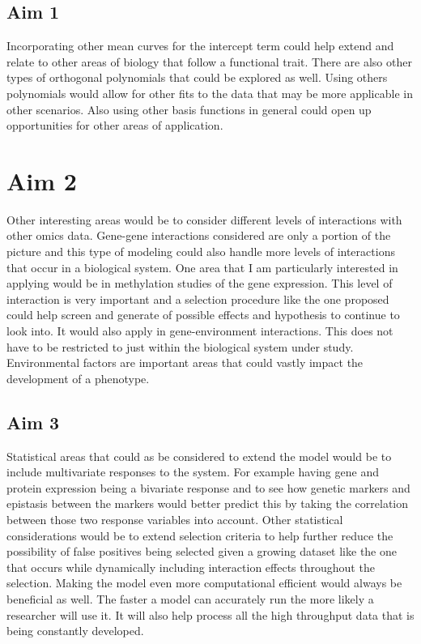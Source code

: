 \documentclass[11pt,]{book}
\theoremstyle{definition}
\theoremstyle{definition}
\theoremstyle{remark}
\begin{document}
\subsection{Aim 1}\label{aim-1}

Incorporating other mean curves for the intercept term could help extend
and relate to other areas of biology that follow a functional trait.
There are also other types of orthogonal polynomials that could be
explored as well. Using others polynomials would allow for other fits to
the data that may be more applicable in other scenarios. Also using
other basis functions in general could open up opportunities for other
areas of application.

\section{Aim 2}\label{aim-2}

Other interesting areas would be to consider different levels of
interactions with other omics data. Gene-gene interactions considered
are only a portion of the picture and this type of modeling could also
handle more levels of interactions that occur in a biological system.
One area that I am particularly interested in applying would be in
methylation studies of the gene expression. This level of interaction is
very important and a selection procedure like the one proposed could
help screen and generate of possible effects and hypothesis to continue
to look into. It would also apply in gene-environment interactions. This
does not have to be restricted to just within the biological system
under study. Environmental factors are important areas that could vastly
impact the development of a phenotype.

\subsection{Aim 3}\label{aim-3}

Statistical areas that could as be considered to extend the model would
be to include multivariate responses to the system. For example having
gene and protein expression being a bivariate response and to see how
genetic markers and epistasis between the markers would better predict
this by taking the correlation between those two response variables into
account. Other statistical considerations would be to extend selection
criteria to help further reduce the possibility of false positives being
selected given a growing dataset like the one that occurs while
dynamically including interaction effects throughout the selection.
Making the model even more computational efficient would always be
beneficial as well. The faster a model can accurately run the more
likely a researcher will use it. It will also help process all the high
throughput data that is being constantly developed.
\end{document}
